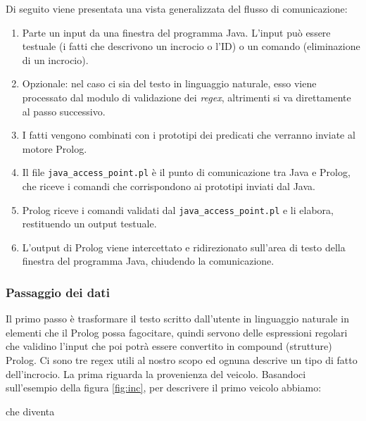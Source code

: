 Di seguito viene presentata una vista generalizzata del flusso di comunicazione:
\begin{enumerate}
	\item Parte un input da una finestra del programma Java. L'input può essere testuale (i fatti che descrivono un incrocio o l'ID) o un comando (eliminazione di un incrocio).
	\item Opzionale: nel caso ci sia del testo in linguaggio naturale, esso viene processato dal modulo di validazione dei \textit{regex}, altrimenti si va direttamente al passo successivo.
	\item I fatti vengono combinati con i prototipi dei predicati che verranno inviate al motore Prolog.
	\item Il file \texttt{java\_access\_point.pl} è il punto di comunicazione tra Java e Prolog, che riceve i comandi che corrispondono ai prototipi inviati dal Java.
	\item Prolog riceve i comandi validati dal \texttt{java\_access\_point.pl} e li elabora, restituendo un output testuale.
	\item L'output di Prolog viene intercettato e ridirezionato sull'area di testo della finestra del programma Java, chiudendo la comunicazione.
\end{enumerate}

\subsubsection{Passaggio dei dati}
\label{sssec:jap}
Il primo passo è trasformare il testo scritto dall'utente in linguaggio naturale in elementi che il Prolog possa fagocitare, quindi servono delle espressioni regolari che validino l'input che poi potrà essere convertito in compound (strutture) Prolog. Ci sono tre regex utili al nostro scopo ed ognuna descrive un tipo di fatto dell'incrocio.
La prima riguarda la provenienza del veicolo. Basandoci sull'esempio della figura \ref{fig:inc}, per descrivere il primo veicolo abbiamo: \\
\setlength{\fboxsep}{6pt}
\setlength{\fboxrule}{3pt}

\par \mbox{} 
\begin{flushleft}
	che diventa
\end{flushleft}
\par \mbox{}

